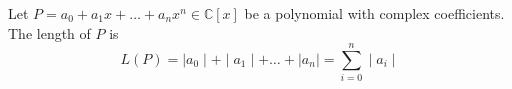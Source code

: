 \documentclass[12pt]{article}
\begin{document}
Let $P = a_0 + a_1x + \ldots + a_nx^n \in \mathbb{C}[x]$ be a polynomial with complex coefficients.  The length of $P$ is
\begin{displaymath}
L(P) = \mid a_0 \mid + \mid a_1 \mid + \ldots + \mid a_n \mid = \sum_{i=0}^n \mid a_i \mid
\end{displaymath}
\end{document}
